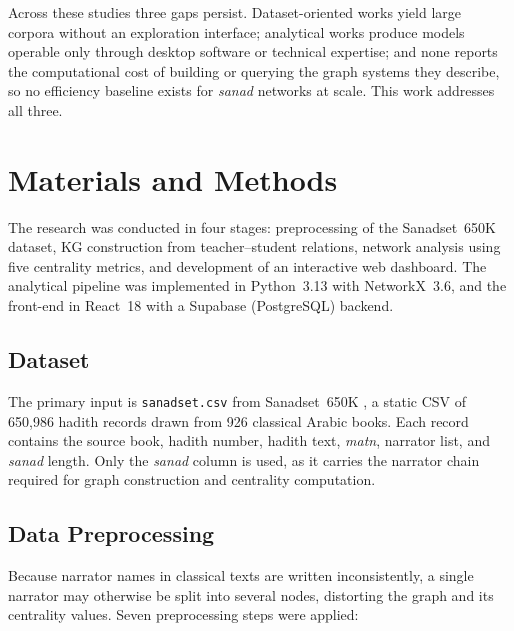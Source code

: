 \documentclass[conference]{IEEEtran}
\begin{document}
Across these studies three gaps persist. Dataset-oriented works yield large
corpora without an exploration interface; analytical works produce models operable
only through desktop software or technical expertise; and none reports the
computational cost of building or querying the graph systems they describe, so no
efficiency baseline exists for \textit{sanad} networks at scale. This work
addresses all three.

\section{Materials and Methods}

The research was conducted in four stages: preprocessing of the Sanadset~650K
dataset, KG construction from teacher--student relations, network analysis using
five centrality metrics, and development of an interactive web dashboard. The
analytical pipeline was implemented in Python~3.13 with NetworkX~3.6, and the
front-end in React~18 with a Supabase (PostgreSQL) backend.

\subsection{Dataset}

The primary input is \texttt{sanadset.csv} from Sanadset~650K
\cite{MGHARI2022108540}, a static CSV of 650{,}986 hadith records drawn from 926
classical Arabic books. Each record contains the source book, hadith number,
hadith text, \textit{matn}, narrator list, and \textit{sanad} length. Only the
\textit{sanad} column is used, as it carries the narrator chain required for
graph construction and centrality computation.

\subsection{Data Preprocessing}

Because narrator names in classical texts are written inconsistently, a single
narrator may otherwise be split into several nodes, distorting the graph and its
centrality values. Seven preprocessing steps were applied:
\end{document}
